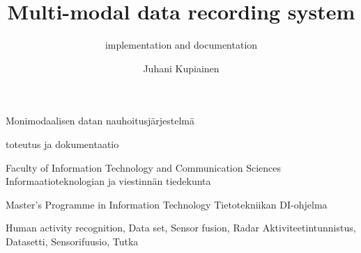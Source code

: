 \documentclass[english, numeric, fleqn, draft]{tauthesis}
\begin{document}

\frontmatter


\title{Multi-modal data recording system}
    {Monimodaalisen datan nauhoitusjärjestelmä}
\subtitle{implementation and documentation}
    {toteutus ja dokumentaatio}

\author{Juhani Kupiainen}


\finishdate{\year}{\month}{\day}


\facultyname
{ Faculty of Information Technology and Communication Sciences }
{ Informaatioteknologian ja viestinnän tiedekunta }

\programmename
{ Master's Programme in Information Technology }
{ Tietotekniikan DI-ohjelma }

\keywords%
    { Human activity recognition, Data set, Sensor fusion, Radar }
    { Aktiviteetintunnistus, Datasetti, Sensorifuusio, Tutka }

\maketitle

\end{document}
